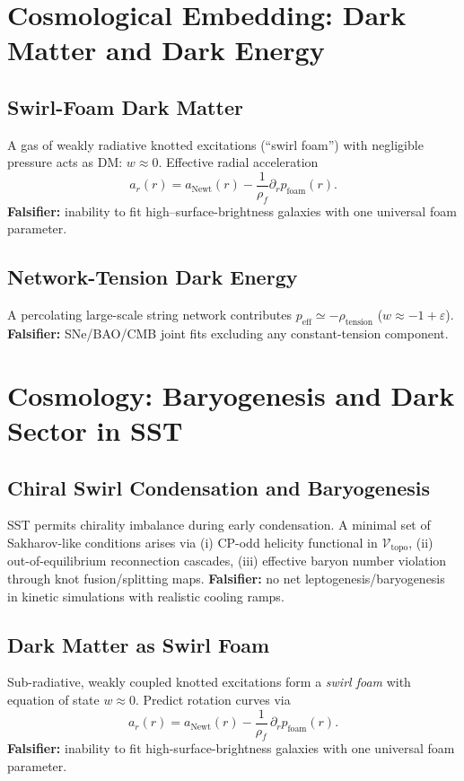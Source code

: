 \documentclass[10pt,reprint,aps,onecolumn,nofootinbib]{revtex4-2}
\newcommand{\rhof}{\rho_{\!f}}                           %
\newcommand{\rhoF}{\rhof}
\begin{document}
    \section{Cosmological Embedding: Dark Matter and Dark Energy}
    \label{sec:SST-cosmo}

    \subsection{Swirl-Foam Dark Matter}
        A gas of weakly radiative knotted excitations (“swirl foam”) with negligible pressure acts as DM: \(w\approx 0\).
        Effective radial acceleration
        \[
            a_r(r)=a_{\text{Newt}}(r)-\frac{1}{\rhoF}\partial_r p_{\text{foam}}(r).
        \]
        \textbf{Falsifier:} inability to fit high–surface-brightness galaxies with one universal foam parameter.

    \subsection{Network-Tension Dark Energy}
        A percolating large-scale string network contributes \(p_{\text{eff}}\simeq -\rho_{\text{tension}}\) (\(w\approx -1+\varepsilon\)).
        \textbf{Falsifier:} SNe/BAO/CMB joint fits excluding any constant-tension component.


    \section{Cosmology: Baryogenesis and Dark Sector in SST}
    \label{sec:SST-cosmology}

        \subsection{Chiral Swirl Condensation and Baryogenesis}
            SST permits chirality imbalance during early condensation. A minimal set of Sakharov-like conditions arises via (i) CP-odd helicity functional in $\mathcal{V}_{\text{topo}}$, (ii) out-of-equilibrium reconnection cascades, (iii) effective baryon number violation through knot fusion/splitting maps. \textbf{Falsifier:} no net leptogenesis/baryogenesis in kinetic simulations with realistic cooling ramps.

        \subsection{Dark Matter as Swirl Foam}
            Sub-radiative, weakly coupled knotted excitations form a \emph{swirl foam} with equation of state $w\approx 0$. Predict rotation curves via
            \[
                a_r(r)=a_{\text{Newt}}(r)-\frac{1}{\rhoF}\,\partial_r p_{\text{foam}}(r).
            \]
            \textbf{Falsifier:} inability to fit high-surface-brightness galaxies with one universal foam parameter.
\end{document}
